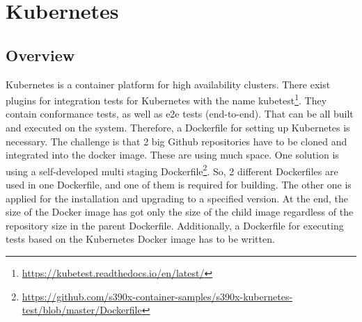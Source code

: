 \chapter{Kubernetes}\label{ch:kubernetes}

\section{Overview}

Kubernetes is a container platform for high availability clusters.
There exist plugins for integration tests for Kubernetes with the name kubetest\footnote{\url{https://kubetest.readthedocs.io/en/latest/}}. They contain conformance tests, as well as e2e tests (end-to-end).
That can be all built and executed on the system. Therefore, a Dockerfile for setting up Kubernetes is necessary. The challenge is that 2 big Github repositories have to be cloned and integrated into the docker image. These are using much space. One solution is using a self-developed multi staging Dockerfile\footnote{\url{https://github.com/s390x-container-samples/s390x-kubernetes-test/blob/master/Dockerfile}}. 
So, 2 different Dockerfiles are used in one Dockerfile, and one of them is required for building. The other one is applied for the installation and upgrading to a specified version. At the end, the size of the Docker image has got only the size of the child image regardless of the repository size in the parent Dockerfile.
Additionally, a Dockerfile for executing tests based on the Kubernetes Docker image has to be written.

